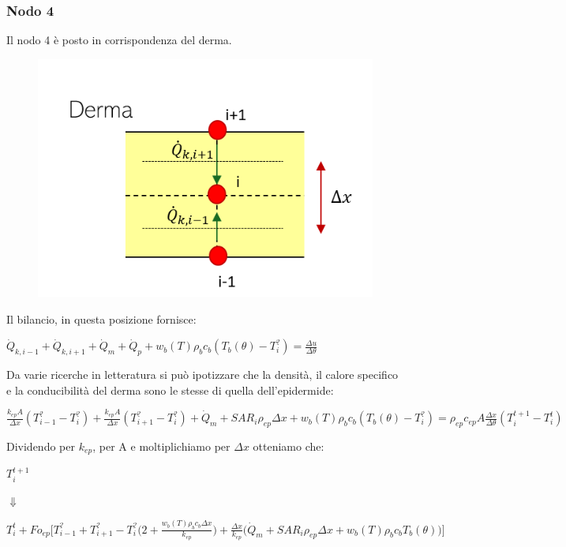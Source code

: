 \subsubsection*{Nodo 4}
Il nodo 4 è posto in corrispondenza del derma.
\begin{figure}[H]
    \centering
    \includegraphics[width=.6\textwidth]{Immagini/Nodi/nodo4.png} 
    \label{nodo4}
\end{figure}
\noindent
Il bilancio, in questa posizione fornisce:
\begin{center}
	$ \Dot{Q} _{k, i-1} +\Dot{Q} _{k, i+1}+ \Dot{Q} _{m} +\Dot{Q} _{p}+ w_b (T) \rho _b c_b (T_b(\theta)-T_i ^?)= \frac{\Delta u}{\Delta \theta} $
\end{center}
Da varie ricerche in letteratura si può ipotizzare che la densità, il calore specifico  e la conducibilità del derma sono le stesse di quella dell'epidermide:
\begin{center}
	$ \frac{k_{ep} A }{\Delta x}(T_{i-1} ^? - T_i ^? ) + \frac{k_{ep} A }{\Delta x}(T_{i+1} ^? - T_i ^? )+ \Dot{Q} _{m} + SAR_i \rho _{ep} \Delta x  + w_b (T) \rho _b c_b (T_b(\theta)-T_i ^?) = \rho _{ep} c_{ep} A \frac{\Delta x}{ \Delta \theta}(T_i ^{t+1} - T_i ^t )$
\end{center}

\noindent
Dividendo per $k_{ep}$, per A e moltiplichiamo per $\Delta x$ otteniamo che:
\begin{center}
	$T_i ^{t+1} $
\end{center}
\begin{center}
	$\Downarrow$
\end{center}
\begin{center}
	$T_i ^t + Fo_{ep} \Bigg[ T_{i-1} ^? + T_{i+1} ^?- T_i ^? \Big(2 + \frac{ w_b (T) \rho _b c_b \Delta x }{k_{ep}} \Big) +  \frac{\Delta x }{k_{ep}} \Big(\Dot{Q} _{m} +  SAR_i \rho _{ep} \Delta x + w_b (T) \rho _b c_b T_b(\theta)\Big) \Bigg]$
\end{center}

